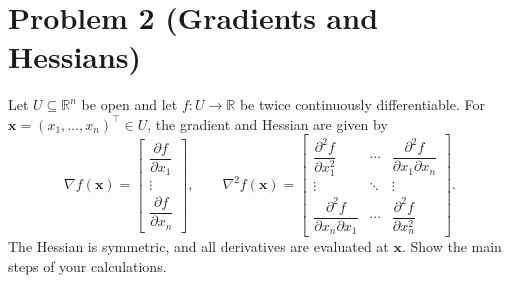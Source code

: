 \documentclass[10pt,a4paper]{article}
\begin{document}
\newpage



\section*{Problem 2 (Gradients and Hessians)}

Let $U\subseteq\mathbb{R}^n$ be open and let
$f:U\to\mathbb{R}$ be twice continuously differentiable.
For $\mathbf{x}=(x_1,\ldots,x_n)^\top\in U$,
the gradient and Hessian are given by
\[
    \nabla f(\mathbf{x})
    =
    \begin{bmatrix}
        \dfrac{\partial f}{\partial x_1}\\[0.4em]
        \vdots\\[0.4em]
        \dfrac{\partial f}{\partial x_n}
    \end{bmatrix},
    \qquad
    \nabla^2 f(\mathbf{x})
    =
    \begin{bmatrix}
        \dfrac{\partial^2 f}{\partial x_1^2}
        & \cdots
        & \dfrac{\partial^2 f}{\partial x_1\partial x_n}
        \\[0.6em]
        \vdots & \ddots & \vdots
        \\[0.6em]
        \dfrac{\partial^2 f}{\partial x_n\partial x_1}
        & \cdots
        & \dfrac{\partial^2 f}{\partial x_n^2}
    \end{bmatrix}.
\]
The Hessian is symmetric, and all derivatives are evaluated
at $\mathbf{x}$. Show the main steps of your calculations.
\end{document}
